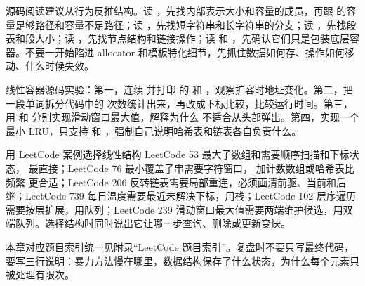 \begin{deepdive}
源码阅读建议从行为反推结构。读 ，先找内部表示大小和容量的成员，再跟  的容量足够路径和容量不足路径；读 ，先找短字符串和长字符串的分支；读 ，先找段表和段大小；读 ，先找节点结构和链接操作；读  和 ，先确认它们只是包装底层容器。不要一开始陷进 allocator 和模板特化细节，先抓住数据如何存、操作如何移动、什么时候失效。
\end{deepdive}

\begin{labbox}
线性容器源码实验：第一，连续  并打印  的  和 ，观察扩容时地址变化。第二，把一段单词拆分代码中的  次数统计出来，再改成下标比较，比较运行时间。第三，用  和  分别实现滑动窗口最大值，解释为什么  不适合从头部弹出。第四，实现一个最小 LRU，只支持  和 ，强制自己说明哈希表和链表各自负责什么。
\end{labbox}

\begin{principlebox}{用 LeetCode 案例选择线性结构}
LeetCode 53 最大子数组和需要顺序扫描和下标状态， 最直接；LeetCode 76 最小覆盖子串需要字符窗口， 加计数数组或哈希表比频繁  更合适；LeetCode 206 反转链表需要局部重连，必须画清前驱、当前和后继；LeetCode 739 每日温度需要最近未解决下标，用栈；LeetCode 102 层序遍历需要按层扩展，用队列；LeetCode 239 滑动窗口最大值需要两端维护候选，用双端队列。选择结构时同时说出它让哪一步查询、删除或更新变快。
\end{principlebox}

本章对应题目索引统一见附录“LeetCode 题目索引”。复盘时不要只写最终代码，要写三行说明：暴力方法慢在哪里，数据结构保存了什么状态，为什么每个元素只被处理有限次。





